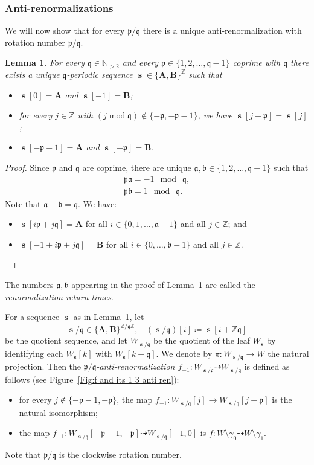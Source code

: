 \documentclass[]{amsart}
\renewcommand{\sp}{{\ \ }}
\newcommand\seq{{\operatorname{\mathbf s}}}
\newcommand{\pp}{\mathfrak{p}}
\renewcommand{\aa}{{\mathfrak{a}}}
\newcommand{\bb}{{\mathfrak{b}}}
\renewcommand{\qq}{\mathfrak{q}}
\newcommand{\A}{\mathbf A}
\newcommand{\B}{\mathbf B}
\newcommand{\N}{\mathbb{N}}
\newcommand{\Z}{\mathbb{Z}}
\newtheorem{lem}[thm]{Lemma}
\theoremstyle{remark}
\numberwithin{equation}{section}
\theoremstyle{definition}
\renewcommand{\mod}{\operatorname{mod}}
\begin{document}
\subsubsection{Anti-renormalizations}
\label{sss:anti renorm} We will now show that for every $\pp/\qq$ there is a unique anti-renormalization with rotation number $\pp/\qq$.
\begin{lem}
\label{lem:seq:p:q}
For every $\qq\in \N_{>2}$ and every $\pp\in \{1,2,\dots ,\qq-1\}$ coprime with $\qq$ there exists a unique $\qq$-periodic sequence $\seq\in \{\A,\B\}^\Z$ such that
\begin{itemize}
\item $\seq[0]=\A$ and $\seq[-1]=\B$; 
\item for every $j\in \Z$ with $(j\mod \qq)\not\in \{-\pp ,-\pp-1\}$, we have $\seq[j+\pp]=\seq[j]$;
\item $\seq[-\pp-1]=\A$ and $\seq[-\pp]=\B$.
\end{itemize}
\end{lem}
\begin{proof} 
 Since $\pp$ and $\qq$ are coprime, there are unique $\aa,\bb\in\{ 1,2,\dots,\qq-1\}$ such that 
\begin{align*}
\pp \aa=-1\sp \mod\sp\qq, \\
\pp \bb=1\sp \mod\sp\qq.
\end{align*}
Note that $\aa+\bb=\qq$. We have:
\begin{itemize}
\item $\seq[i\pp +j\qq]=\A$ for all $i\in \{0,1,\dots, \aa-1\}$ and all $j\in \Z$; and
\item $\seq[-1+i\pp +j\qq]=\B$ for all $i\in \{0,\dots, \bb-1\}$ and all $j\in \Z$.
\end{itemize}
\end{proof}
The numbers $\aa, \bb$ appearing in the proof of Lemma~\ref{lem:seq:p:q} are called the \emph{renormalization return times}.


For a sequence $\seq$ as in Lemma~\ref{lem:seq:p:q}, let 
\[\seq/\qq \in \{\A,\B\}^{\Z/\qq\Z},\sp\sp (\seq/\qq)[i] \coloneqq \seq[i+\Z\qq]\]
be the quotient sequence, and let $W_{\seq/\qq}$ be the quotient of the leaf $W_{\seq}$ by identifying each $W_\seq[k]$ with $W_\seq[k+\qq]$. We denote by $\pi\colon W_{\seq/\qq}\to W$ the natural projection. Then the \emph{$\pp/\qq$-anti-renormalization $f_{-1}\colon W_{\seq/\qq}\dashrightarrow W_{\seq/\qq}$}  is defined as follows (see Figure~\ref{Fig:f and its 1 3 anti ren}):
\begin{itemize}
\item for every $j\not\in \{-\pp-1,-\pp\}$, the map $f_{-1}\colon W_{\seq/\qq}[j] \to W_{\seq/\qq}[j+\pp]$ is the natural isomorphism;
\item the map $f_{-1}\colon W_{\seq/\qq}[-\pp-1,-\pp]\dashrightarrow W_{\seq/\qq}[-1,0]$ is ${f\colon W\setminus \gamma_0\dashrightarrow  W\setminus \gamma_1}$.
\end{itemize}
Note that $\pp/\qq$ is the clockwise rotation number.
\end{document}
